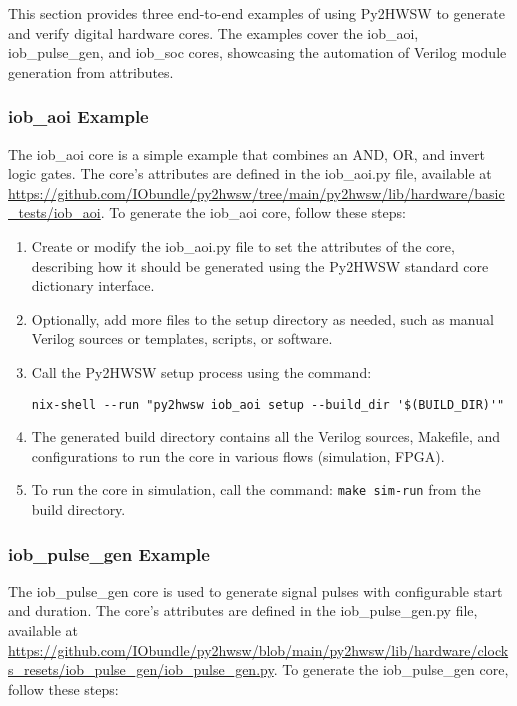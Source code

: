 %

This section provides three end-to-end examples of using Py2HWSW to generate and verify digital hardware cores. The examples cover the iob\_aoi, iob\_pulse\_gen, and iob\_soc cores, showcasing the automation of Verilog module generation from attributes.

\subsubsection{iob\_aoi Example}

The iob\_aoi core is a simple example that combines an AND, OR, and invert logic gates. The core's attributes are defined in the iob\_aoi.py file, available at \url{https://github.com/IObundle/py2hwsw/tree/main/py2hwsw/lib/hardware/basic_tests/iob_aoi}. To generate the iob\_aoi core, follow these steps:

\begin{enumerate}
\item Create or modify the iob\_aoi.py file to set the attributes of the core, describing how it should be generated using the Py2HWSW standard core dictionary interface.
\item Optionally, add more files to the setup directory as needed, such as manual Verilog sources or templates, scripts, or software.
\item Call the Py2HWSW setup process using the command:
\begin{verbatim}
nix-shell --run "py2hwsw iob_aoi setup --build_dir '$(BUILD_DIR)'"
\end{verbatim}
\item The generated build directory contains all the Verilog sources, Makefile, and configurations to run the core in various flows (simulation, FPGA).
\item To run the core in simulation, call the command: \texttt{make sim-run} from the build directory.
\end{enumerate}

\subsubsection{iob\_pulse\_gen Example}

The iob\_pulse\_gen core is used to generate signal pulses with configurable start and duration. The core's attributes are defined in the iob\_pulse\_gen.py file, available at \url{https://github.com/IObundle/py2hwsw/blob/main/py2hwsw/lib/hardware/clocks_resets/iob_pulse_gen/iob_pulse_gen.py}. To generate the iob\_pulse\_gen core, follow these steps:

